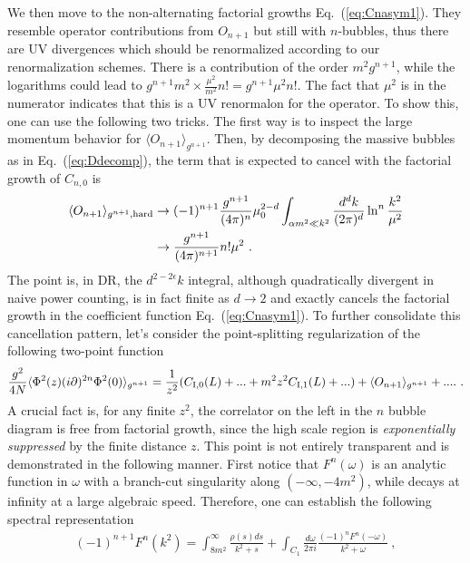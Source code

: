 \documentclass[a4paper,11pt]{article}
\begin{document}
We then move to the non-alternating factorial growths Eq.~(\ref{eq:Cnasym1}). They resemble operator contributions from $O_{n+1}$ but still with $n$-bubbles, thus there are UV divergences which should be renormalized according to our renormalization schemes. There is a contribution of the order $m^2g^{n+1}$, while the logarithms could lead to $g^{n+1}m^2\times\frac{\mu^2}{m^2}n!=g^{n+1}\mu^2n!$. The fact that $\mu^2$ is in the numerator indicates that this is a UV renormalon for the operator. To show this, one can use the following two tricks. The first way is to inspect the large momentum behavior for $\langle O_{n+1}\rangle_{g^{n+1}}$. Then, by decomposing the massive bubbles as in Eq.~(\ref{eq:Ddecomp}), the term that is expected to cancel with the factorial growth of $C_{n,0}$ is
\begin{align}
\langle O_{n+1} \rangle_{g^{n+1},{\rm hard}} &\rightarrow (-1)^{n+1}\frac{g^{n+1}}{(4\pi)^{n}}\mu_0^{2-d}\int_{ \alpha m^2\ll k^2}\frac{d^{d}k}{(2\pi)^d}\ln^{n}\frac{k^2}{\mu^2} \nonumber 
 \\ &\rightarrow \frac{g^{n+1}}{(4\pi)^{n+1}}n!\mu^2 \ . \label{eq:operatoralshard1}
\end{align}
The point is, in DR, the $d^{2-2\epsilon}k$ integral, although quadratically divergent in naive power counting, is in fact finite as $d\rightarrow 2$ and exactly cancels the factorial growth in the coefficient function Eq.~(\ref{eq:Cnasym1}). To further consolidate this cancellation pattern, let's consider the point-splitting regularization of the following two-point function
\begin{align}\label{eq:anotherOPE}
\frac{g^2}{4N}\langle\Phi^2(z)(i\partial)^{2n}\Phi^2(0)\rangle_{g^{n+1}}=\frac{1}{z^2}(C_{{\rm I},0}(L)+...+m^2z^2C_{{\rm I},1}(L)+...)+\langle O_{n+1} \rangle_{g^{n+1}}+.... \ .
\end{align}
A crucial fact is, for any finite $z^2$, the correlator on the left in the $n$ bubble diagram is free from factorial growth, since the high scale region is {\it exponentially suppressed} by the finite distance $z$. This point is not entirely transparent and is demonstrated in the following manner. First notice that $F^n(\omega)$ is an analytic function in $\omega$ with a branch-cut singularity along $(-\infty,-4m^2)$, while decays at infinity at a large algebraic speed. Therefore, one can establish the following spectral representation
\begin{align}
(-1)^{n+1}F^n(k^2)=\int_{8m^2}^\infty \frac{\rho(s)ds}{k^2+s}+\int_{C_1} \frac{d\omega}{2\pi i} \frac{(-1)^{n}F^n(-\omega)}{k^2+\omega} \ , 
\end{align}
\end{document}
